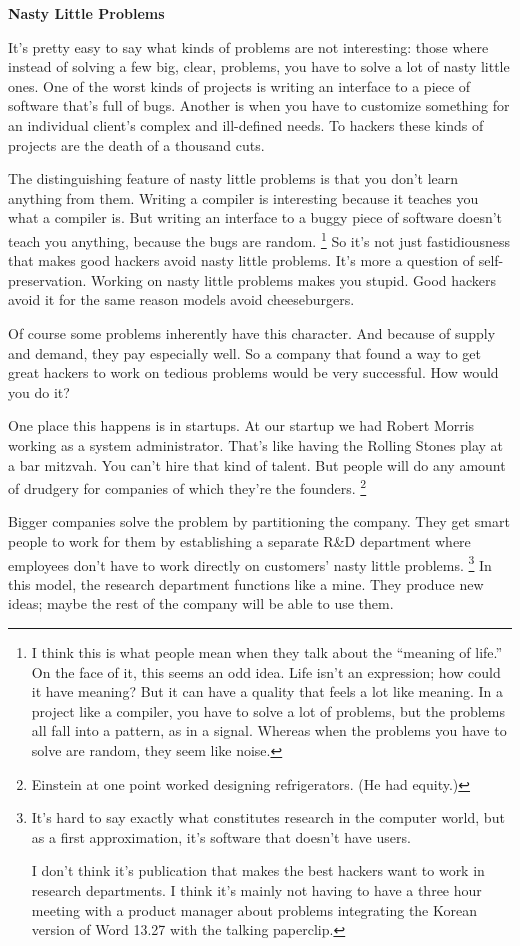 \textbf{Nasty Little Problems}

It's pretty easy to say what kinds of problems are not interesting:
those where instead of solving a few big, clear, problems, you have to
solve a lot of nasty little ones. One of the worst kinds of projects is
writing an interface to a piece of software that's full of bugs. Another
is when you have to customize something for an individual client's
complex and ill-defined needs. To hackers these kinds of projects are
the death of a thousand cuts.

The distinguishing feature of nasty little problems is that you don't
learn anything from them. Writing a compiler is interesting because it
teaches you what a compiler is. But writing an interface to a buggy
piece of software doesn't teach you anything, because the bugs are
random. \footnote{I think this is what people mean when they talk about the
``meaning of life.'' On the face of it, this seems an odd idea. Life
isn't an expression; how could it have meaning? But it can have a
quality that feels a lot like meaning. In a project like a compiler, you
have to solve a lot of problems, but the problems all fall into a
pattern, as in a signal. Whereas when the problems you have to solve are
random, they seem like noise.} So it's not just fastidiousness that makes good hackers
avoid nasty little problems. It's more a question of self-preservation.
Working on nasty little problems makes you stupid. Good hackers avoid it
for the same reason models avoid cheeseburgers.

Of course some problems inherently have this character. And because of
supply and demand, they pay especially well. So a company that found a
way to get great hackers to work on tedious problems would be very
successful. How would you do it?

One place this happens is in startups. At our startup we had Robert
Morris working as a system administrator. That's like having the Rolling
Stones play at a bar mitzvah. You can't hire that kind of talent. But
people will do any amount of drudgery for companies of which they're the
founders. \footnote{Einstein at one point worked designing refrigerators. (He had
equity.)}

Bigger companies solve the problem by partitioning the company. They get
smart people to work for them by establishing a separate R\&D department
where employees don't have to work directly on customers' nasty little
problems. \footnote{It's hard to say exactly what constitutes research in the
computer world, but as a first approximation, it's software that doesn't
have users.

I don't think it's publication that makes the best hackers want to work
in research departments. I think it's mainly not having to have a three
hour meeting with a product manager about problems integrating the
Korean version of Word 13.27 with the talking paperclip.} In this model, the research department functions like
a mine. They produce new ideas; maybe the rest of the company will be
able to use them.

